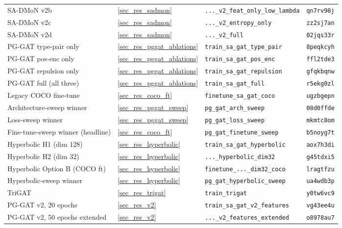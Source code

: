 {\begin{longtable}{@{}llll@{}}
SA-DMoN v2b                       & \ref{sec_res_sadmon}         & \texttt{...\_v2\_feat\_only\_low\_lambda} & \texttt{qn7rv98j} \\
SA-DMoN v2c                       & \ref{sec_res_sadmon}         & \texttt{...\_v2\_entropy\_only}           & \texttt{zz2sj7an} \\
SA-DMoN v2d                       & \ref{sec_res_sadmon}         & \texttt{...\_v2\_full}                    & \texttt{02jqs33r} \\
PG-GAT type-pair only             & \ref{sec_res_pggat_ablations}& \texttt{train\_sa\_gat\_type\_pair}       & \texttt{8peqkcyh} \\
PG-GAT pos-enc only               & \ref{sec_res_pggat_ablations}& \texttt{train\_sa\_gat\_pos\_enc}         & \texttt{ffl2tde3} \\
PG-GAT repulsion only             & \ref{sec_res_pggat_ablations}& \texttt{train\_sa\_gat\_repulsion}        & \texttt{gfqkbqnw} \\
PG-GAT full (all three)           & \ref{sec_res_pggat_ablations}& \texttt{train\_sa\_gat\_full}             & \texttt{r5ekg0zl} \\
Legacy COCO fine-tune             & \ref{sec_res_coco_ft}        & \texttt{finetune\_sa\_gat\_coco}          & \texttt{ugzbgepn} \\
Architecture-sweep winner         & \ref{sec_res_pggat_sweep}    & \texttt{pg\_gat\_arch\_sweep}             & \texttt{08d0ffde} \\
Loss-sweep winner                 & \ref{sec_res_pggat_sweep}    & \texttt{pg\_gat\_loss\_sweep}             & \texttt{mkmtc8om} \\
Fine-tune-sweep winner (headline) & \ref{sec_res_coco_ft}        & \texttt{pg\_gat\_finetune\_sweep}         & \texttt{b5noyg7t} \\
Hyperbolic H1 (dim 128)           & \ref{sec_res_hyperbolic}     & \texttt{train\_sa\_gat\_hyperbolic}       & \texttt{aox7h3di} \\
Hyperbolic H2 (dim 32)            & \ref{sec_res_hyperbolic}     & \texttt{...\_hyperbolic\_dim32}           & \texttt{g45tdxi5} \\
Hyperbolic Option B (COCO ft)     & \ref{sec_res_hyperbolic}     & \texttt{finetune\_...\_dim32\_coco}       & \texttt{lragtfzu} \\
Hyperbolic-sweep winner           & \ref{sec_res_hyperbolic}     & \texttt{pg\_gat\_hyperbolic\_sweep}       & \texttt{ua4wdb3p} \\
TriGAT                            & \ref{sec_res_trigat}         & \texttt{train\_trigat}                    & \texttt{y0tw6vc9} \\
PG-GAT v2, 20 epochs              & \ref{sec_res_v2}             & \texttt{train\_sa\_gat\_v2\_features}     & \texttt{vg43ee4u} \\
PG-GAT v2, 50 epochs extended     & \ref{sec_res_v2}             & \texttt{...\_v2\_features\_extended}      & \texttt{o8978au7} \\
\end{longtable}
}

